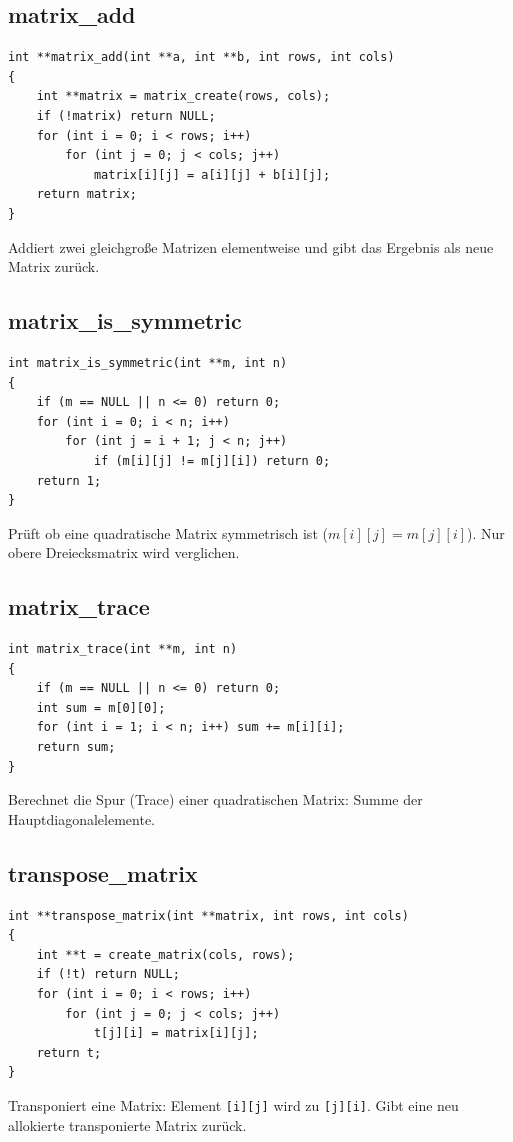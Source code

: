 \documentclass[10pt, a4paper]{article}
\begin{document}
\subsection{matrix\_add}
\begin{lstlisting}
int **matrix_add(int **a, int **b, int rows, int cols)
{
    int **matrix = matrix_create(rows, cols);
    if (!matrix) return NULL;
    for (int i = 0; i < rows; i++)
        for (int j = 0; j < cols; j++)
            matrix[i][j] = a[i][j] + b[i][j];
    return matrix;
}
\end{lstlisting}
Addiert zwei gleichgro\ss e Matrizen elementweise und gibt das Ergebnis als neue Matrix zur\"uck.

\subsection{matrix\_is\_symmetric}
\begin{lstlisting}
int matrix_is_symmetric(int **m, int n)
{
    if (m == NULL || n <= 0) return 0;
    for (int i = 0; i < n; i++)
        for (int j = i + 1; j < n; j++)
            if (m[i][j] != m[j][i]) return 0;
    return 1;
}
\end{lstlisting}
Pr\"uft ob eine quadratische Matrix symmetrisch ist ($m[i][j] = m[j][i]$). Nur obere Dreiecksmatrix wird verglichen.

\subsection{matrix\_trace}
\begin{lstlisting}
int matrix_trace(int **m, int n)
{
    if (m == NULL || n <= 0) return 0;
    int sum = m[0][0];
    for (int i = 1; i < n; i++) sum += m[i][i];
    return sum;
}
\end{lstlisting}
Berechnet die Spur (Trace) einer quadratischen Matrix: Summe der Hauptdiagonalelemente.

\subsection{transpose\_matrix}
\begin{lstlisting}
int **transpose_matrix(int **matrix, int rows, int cols)
{
    int **t = create_matrix(cols, rows);
    if (!t) return NULL;
    for (int i = 0; i < rows; i++)
        for (int j = 0; j < cols; j++)
            t[j][i] = matrix[i][j];
    return t;
}
\end{lstlisting}
Transponiert eine Matrix: Element \texttt{[i][j]} wird zu \texttt{[j][i]}. Gibt eine neu allokierte transponierte Matrix zur\"uck.
\end{document}
